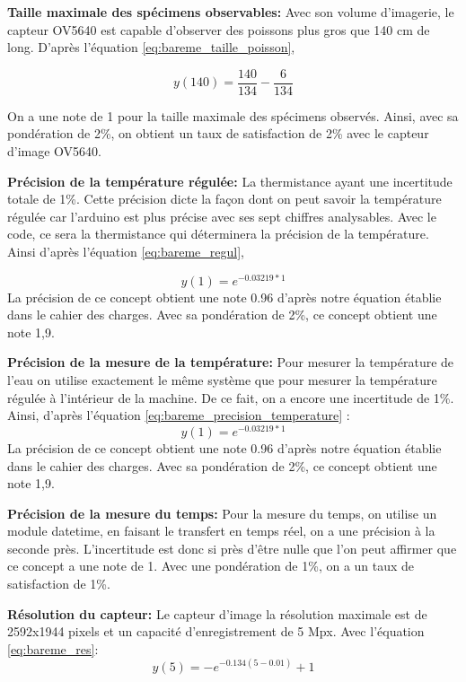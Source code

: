 \textbf{Taille maximale des spécimens observables:}
Avec son volume d'imagerie, le capteur OV5640 est capable d'observer des poissons plus gros que 140 cm de long. D'après l'équation \ref{eq:bareme_taille_poisson},

\begin{equation}
y(140) =  \frac{140}{134}- \frac{6}{134}
\end{equation}


On a une note de 1 pour la taille maximale des spécimens observés. Ainsi, avec sa pondération de 2\%, on obtient un taux de satisfaction de 2\% avec le capteur d'image OV5640.

\textbf{Précision de la température régulée:}
La thermistance ayant une incertitude totale de 1\%. Cette précision dicte la façon dont on peut savoir la température régulée car l'arduino est plus précise avec ses sept chiffres analysables. Avec le code, ce sera la thermistance qui déterminera la précision de la température. Ainsi d'après l'équation \ref{eq:bareme_regul}, 

\begin{equation}
    y(1) = e^{-0.03219*1}
\end{equation}
La précision de ce concept obtient une note 0.96 d'après notre équation établie dans le cahier des charges. Avec sa pondération de 2\%, ce concept obtient une note 1,9.

\textbf{Précision de la mesure de la température:}
Pour mesurer la température de l'eau on utilise exactement le même système que pour mesurer la température régulée à l'intérieur de la machine. De ce fait, on a encore une incertitude de 1\%. Ainsi, d'après l'équation \ref{eq:bareme_precision_temperature} :
\begin{equation}
    y(1) = e^{-0.03219*1}
\end{equation}
La précision de ce concept obtient une note 0.96 d'après notre équation établie dans le cahier des charges. Avec sa pondération de 2\%, ce concept obtient une note 1,9.

\textbf{Précision de la mesure du temps:}
Pour la mesure du temps, on utilise un module datetime, en faisant le transfert en temps réel, on a une précision à la seconde près. L'incertitude est donc si près d'être nulle que l'on peut affirmer que ce concept a une note de 1. Avec une pondération de 1\%, on a un taux de satisfaction de 1\%. 

\textbf{Résolution du capteur:}
Le capteur d'image la résolution maximale est de 2592x1944 pixels et un capacité d'enregistrement de 5 Mpx. Avec l'équation \ref{eq:bareme_res}:
\begin{equation}
    y(5) = - e^{-0.134(5-0.01)}+1
\end{equation}

